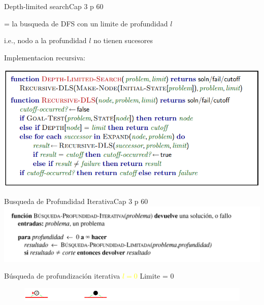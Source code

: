 \documentclass{beamer}
\theoremstyle{definition}
\theoremstyle{theorem}
\theoremstyle{remark}
\begin{document}
\begin{frame}{Depth-limited search}{Cap 3 p 60}
    \begin{right}
        
        = la busqueda de DFS con un limite de profundidad $l$
        
        i.e., nodo a la profundidad $l$ no tienen sucesores
        
        Implementacion recursiva:
        
        \includegraphics[scale = 0.5]{dfs_limit.PNG}
        
    \end{right}
\end{frame}

\begin{frame}{Busqueda de Profundidad Iterativa}{Cap 3 p 60}
    \includegraphics[scale = 0.35]{61_dfsIterativo.PNG}
\end{frame}

\begin{frame}{Búsqueda de profundización iterativa \textcolor{Yellow}{$l=0$}}
    Limite = 0
    \begin{figure}\includegraphics[width =123mm]{62_IDS_l0.PNG}\end{figure}
\end{frame}
    
\end{document}
